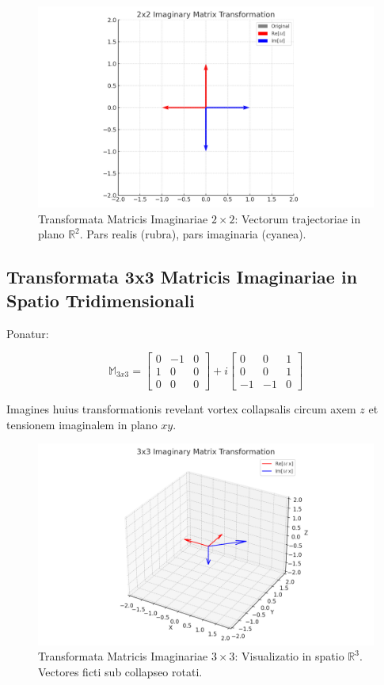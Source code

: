 \begin{figure}[H]
  \centering
  \includegraphics[width=0.8\linewidth]{images/matrix_transform_2x2.png}
  \caption{Transformata Matricis Imaginariae $2 \times 2$: Vectorum trajectoriae in plano $\mathbb{R}^2$. Pars realis (rubra), pars imaginaria (cyanea).}
\end{figure}

\subsection*{Transformata 3x3 Matricis Imaginariae in Spatio Tridimensionali}

Ponatur:

\[
\mathbb{M}_{3x3} = \begin{bmatrix}
0 & -1 & 0 \\
1 & 0 & 0 \\
0 & 0 & 0
\end{bmatrix} + i \begin{bmatrix}
0 & 0 & 1 \\
0 & 0 & 1 \\
-1 & -1 & 0
\end{bmatrix}
\]

Imagines huius transformationis revelant vortex collapsalis circum axem $z$ et tensionem imaginalem in plano $xy$.

\begin{figure}[H]
  \centering
  \includegraphics[width=\linewidth]{images/matrix_transform_3x3.png}
  \caption{Transformata Matricis Imaginariae $3 \times 3$: Visualizatio in spatio $\mathbb{R}^3$. Vectores ficti sub collapseo rotati.}
\end{figure}

